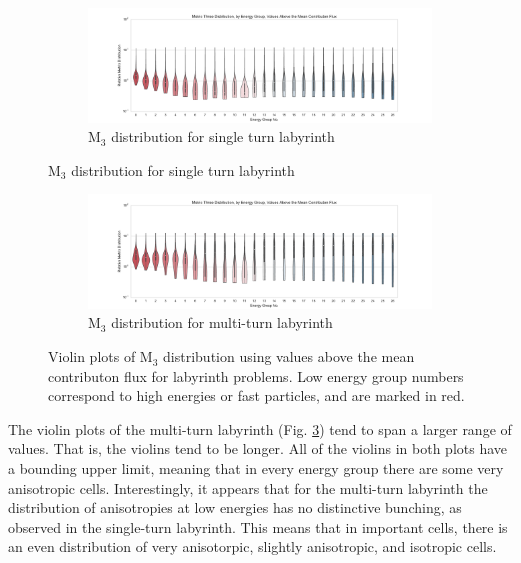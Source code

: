 \begin{figure}[htb!]
  \centering
  \begin{subfigure}[t]{\textwidth}
    \includegraphics[width=\linewidth]{./chapters/characterization_probs/figures/char/maze2/metric_three_violin_mean.pdf}
    \caption{M$_{3}$ distribution for single turn labyrinth}
    \label{fig:maze2M3violins}
  \end{subfigure}
\end{figure}
\begin{figure}[htb!]\ContinuedFloat
  \centering
  \begin{subfigure}[t]{\textwidth}
    \includegraphics[width=\linewidth]{./chapters/characterization_probs/figures/char/maze1/metric_three_violin_mean.pdf}
    \caption{M$_3$ distribution for multi-turn labyrinth}
    \label{fig:maze1M3violins}
  \end{subfigure}
  \caption[Violin plots of M$_{3}$ distribution using values above the mean
  contributon flux for labyrinth problems.]
  {Violin plots of M$_{3}$ distribution using values above the mean
  contributon flux for labyrinth problems. Low energy group numbers correspond
  to high energies or fast particles, and are marked in red.}
  \label{fig:labyrinthviolins}
\end{figure}

The violin plots of the multi-turn labyrinth (Fig. \ref{fig:maze1M3violins})
tend to span a larger range of values. That is, the violins tend to be longer.
All of the violins in both plots have a bounding upper limit, meaning that in
every energy group there are some very anisotropic cells. Interestingly, it
appears that for the multi-turn labyrinth the distribution of anisotropies at
low energies has no distinctive bunching, as observed in the single-turn
labyrinth. This means that in important cells, there is an even distribution of
very anisotorpic, slightly anisotropic, and isotropic cells.

